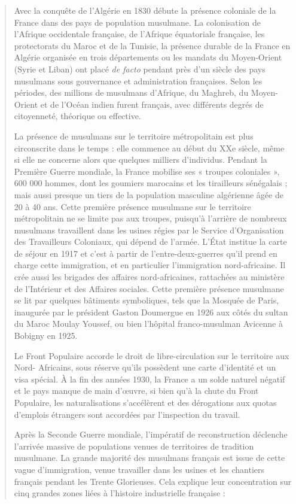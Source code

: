 \begin{quote}
Avec la conquête de l'Algérie en 1830 débute la présence coloniale de la
France dans des pays de population musulmane. La colonisation de
l'Afrique occidentale française, de l'Afrique équatoriale française, les
protectorats du Maroc et de la Tunisie, la présence durable de la France
en Algérie organisée en trois départements ou les mandats du
Moyen-Orient (Syrie et Liban) ont placé \emph{de facto} pendant près
d'un siècle des pays musulmans sous gouvernance et administration
françaises. Selon les périodes, des millions de musulmans d'Afrique, du
Maghreb, du Moyen- Orient et de l'Océan indien furent français, avec
différents degrés de citoyenneté, théorique ou effective.

La présence de musulmans sur le territoire métropolitain est plus
circonscrite dans le temps : elle commence au début du XXe siècle, même
si elle ne concerne alors que quelques milliers d'individus. Pendant la
Première Guerre mondiale, la France mobilise ses « troupes coloniales »,
600 000 hommes, dont les goumiers marocains et les tirailleurs
sénégalais ; mais aussi presque un tiers de la population masculine
algérienne âgée de 20 à 40 ans. Cette première présence musulmane sur le
territoire métropolitain ne se limite pas aux troupes, puisqu'à
l'arrière de nombreux musulmans travaillent dans les usines régies par
le Service d'Organisation des Travailleurs Coloniaux, qui dépend de
l'armée. L'État institue la carte de séjour en 1917 et c'est à partir de
l'entre-deux-guerres qu'il prend en charge cette immigration, et en
particulier l'immigration nord-africaine. Il crée aussi les brigades des
affaires nord-africaines, rattachées au ministère de l'Intérieur et des
Affaires sociales. Cette première présence musulmane se lit par quelques
bâtiments symboliques, tels que la Mosquée de Paris, inaugurée par le
président Gaston Doumergue en 1926 aux côtés du sultan du Maroc Moulay
Youssef, ou bien l'hôpital franco-musulman Avicenne à Bobigny en 1925.

Le Front Populaire accorde le droit de libre-circulation sur le
territoire aux Nord- Africains, sous réserve qu'ils possèdent une carte
d'identité et un visa spécial. À la fin des années 1930, la France a un
solde naturel négatif et le pays manque de main d'œuvre, si bien qu'à la
chute du Front Populaire, les naturalisations s'accélèrent et des
dérogations aux quotas d'emplois étrangers sont accordées par
l'inspection du travail.



Après la Seconde Guerre mondiale, l'impératif de reconstruction
déclenche l'arrivée massive de populations venues de territoires de
tradition musulmane. La grande majorité des musulmans français est issue
de cette vague d'immigration, venue travailler dans les usines et les
chantiers français pendant les Trente Glorieuses. Cela explique leur
concentration sur cinq grandes zones liées à l'histoire industrielle
française :
\end{quote}


